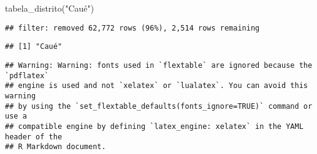 \documentclass[
]{article}
\newenvironment{Shaded}{\begin{snugshade}}{\end{snugshade}}
\newcommand{\FunctionTok}[1]{\textcolor[rgb]{0.00,0.00,0.00}{#1}}
\newcommand{\NormalTok}[1]{#1}
\newcommand{\StringTok}[1]{\textcolor[rgb]{0.31,0.60,0.02}{#1}}
\begin{document}
\begin{Shaded}
\begin{Highlighting}[]
\FunctionTok{tabela\_distrito}\NormalTok{(}\StringTok{"Caué"}\NormalTok{)}
\end{Highlighting}
\end{Shaded}

\begin{verbatim}
## filter: removed 62,772 rows (96%), 2,514 rows remaining
\end{verbatim}

\begin{verbatim}
## [1] "Caué"
\end{verbatim}

\begin{verbatim}
## Warning: Warning: fonts used in `flextable` are ignored because the `pdflatex`
## engine is used and not `xelatex` or `lualatex`. You can avoid this warning
## by using the `set_flextable_defaults(fonts_ignore=TRUE)` command or use a
## compatible engine by defining `latex_engine: xelatex` in the YAML header of the
## R Markdown document.
\end{verbatim}

\providecommand{\docline}[3]{\noalign{\global\setlength{\arrayrulewidth}{#1}}\arrayrulecolor[HTML]{#2}\cline{#3}}

\setlength{\tabcolsep}{2pt}

\renewcommand*{\arraystretch}{1.5}
\end{document}
